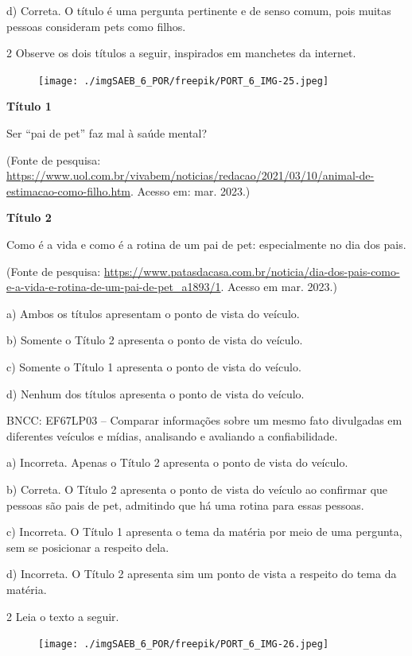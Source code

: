 d) Correta. O título é uma pergunta pertinente e de senso comum, pois
muitas pessoas consideram pets como filhos.

\num{2} Observe os dois títulos a seguir, inspirados em manchetes da
internet.

\begin{figure}
\texttt{[image: ./imgSAEB\_6\_POR/freepik/PORT\_6\_IMG-25.jpeg]}
\end{figure}

\textbf{Título 1}

Ser ``pai de pet'' faz mal à saúde mental?

(Fonte de pesquisa:
\url{https://www.uol.com.br/vivabem/noticias/redacao/2021/03/10/animal-de-estimacao-como-filho.htm}.
Acesso em: mar. 2023.)

\textbf{Título 2}

Como é a vida e como é a rotina de um pai de pet: especialmente no dia
dos pais.

(Fonte de pesquisa:
\url{https://www.patasdacasa.com.br/noticia/dia-dos-pais-como-e-a-vida-e-rotina-de-um-pai-de-pet_a1893/1}.
Acesso em mar. 2023.)

a) Ambos os títulos apresentam o ponto de vista do veículo.

b) Somente o Título 2 apresenta o ponto de vista do veículo.

c) Somente o Título 1 apresenta o ponto de vista do veículo.

d) Nenhum dos títulos apresenta o ponto de vista do veículo.

BNCC: EF67LP03 -- Comparar informações sobre um mesmo fato divulgadas em
diferentes veículos e mídias, analisando e avaliando a confiabilidade.

a) Incorreta. Apenas o Título 2 apresenta o ponto de vista do veículo.

b) Correta. O Título 2 apresenta o ponto de vista do veículo ao
confirmar que pessoas são pais de pet, admitindo que há uma rotina para
essas pessoas.

c) Incorreta. O Título 1 apresenta o tema da matéria por meio de uma
pergunta, sem se posicionar a respeito dela.

d) Incorreta. O Título 2 apresenta sim um ponto de vista a respeito do
tema da matéria.

\num{2} Leia o texto a seguir.

\begin{figure}
\texttt{[image: ./imgSAEB\_6\_POR/freepik/PORT\_6\_IMG-26.jpeg]}
\end{figure}

